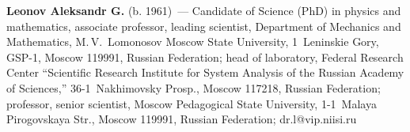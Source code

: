 \vspace*{3pt}

\noindent
\textbf{Leonov Aleksandr G.} (b. 1961)~--- Candidate of Science (PhD) in physics and mathematics, associate 
professor, leading scientist, Department of Mechanics and Mathematics, 
M.\,V.~Lomonosov Moscow State 
University, 1~Leninskie Gory, GSP-1, Moscow 119991, Russian Federation; head of laboratory, Federal 
Research Center ``Scientific Research Institute for System Analysis of the Russian Academy of Sciences,''
 36-1~Nakhimovsky Prosp., Moscow 117218, Russian Federation; 
 professor, senior scientist, Moscow 
Pedagogical State University, 1-1~Malaya Pirogovskaya Str., Moscow 119991, Russian Federation; 
\mbox{dr.l@vip.niisi.ru}


\label{end\stat}

\renewcommand{\bibname}{\protect\rm Литература} 
    